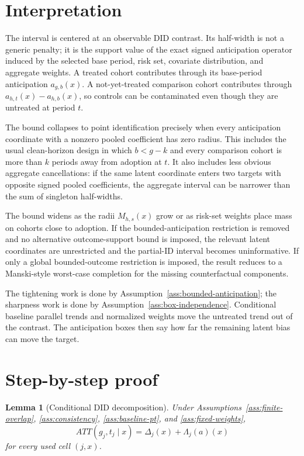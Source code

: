 \documentclass[11pt]{article}
\theoremstyle{definition}
\theoremstyle{plain}
\newtheorem{lemma}{Lemma}
\theoremstyle{remark}
\begin{document}
\section{Interpretation}
The interval is centered at an observable DID contrast.  Its half-width is not a
generic penalty; it is the support value of the exact signed anticipation
operator induced by the selected base period, risk set, covariate distribution,
and aggregate weights.  A treated cohort contributes through its base-period
anticipation \(a_{g,b}(x)\).  A not-yet-treated comparison cohort contributes
through \(a_{h,t}(x)-a_{h,b}(x)\), so controls can be contaminated even though
they are untreated at period \(t\).

The bound collapses to point identification precisely when every anticipation
coordinate with a nonzero pooled coefficient has zero radius.  This includes the
usual clean-horizon design in which \(b<g-k\) and every comparison cohort is more
than \(k\) periods away from adoption at \(t\).  It also includes less obvious
aggregate cancellations: if the same latent coordinate enters two targets with
opposite signed pooled coefficients, the aggregate interval can be narrower than
the sum of singleton half-widths.

The bound widens as the radii \(M_{h,s}(x)\) grow or as risk-set weights place
mass on cohorts close to adoption.  If the bounded-anticipation restriction is
removed and no alternative outcome-support bound is imposed, the relevant latent
coordinates are unrestricted and the partial-ID interval becomes uninformative.
If only a global bounded-outcome restriction is imposed, the result reduces to a
Manski-style worst-case completion for the missing counterfactual components.

The tightening work is done by Assumption~\ref{ass:bounded-anticipation}; the
sharpness work is done by Assumption~\ref{ass:box-independence}.  Conditional
baseline parallel trends and normalized weights move the untreated trend out of
the contrast.  The anticipation boxes then say how far the remaining latent bias
can move the target.

\section{Step-by-step proof}
\begin{lemma}[Conditional DID decomposition]\label{lem:conditional-decomp}
Under Assumptions~\ref{ass:finite-overlap}, \ref{ass:consistency},
\ref{ass:baseline-pt}, and \ref{ass:fixed-weights},
\[
  ATT(g_j,t_j\mid x)=\Delta_j(x)+\Lambda_j(a)(x)
\]
for every used cell \((j,x)\).
\end{lemma}
\end{document}
